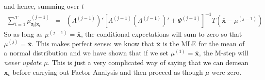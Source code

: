 \documentclass[12pt]{article}
\theoremstyle{definition}
\begin{document}
and hence, summing over $t$
	\begin{eqnarray*}
		\sum_{t = 1}^T \mu^{(j-1)}_{\mathbf{z}_t|\mathbf{x}_t} &=& \left(\Lambda^{(j-1)}\right)' \left[\Lambda^{(j-1)} \left(\Lambda^{(j-1)}\right)' + \Psi^{(j-1)}\right]^{-1} T\left(\bar{\mathbf{x}} - \mu^{(j-1)} \right)
 	\end{eqnarray*}
So as long as $\mu^{(j-1)} = \bar{\mathbf{x}}$, the conditional expectations will sum to zero so that $\mu^{(j)} = \bar{\mathbf{x}}$. This makes perfect sense: we know that $\bar{\mathbf{x}}$ is the MLE for the mean of a normal distribution and we have shown that if we set $\mu^{(1)} = \bar{\mathbf{x}}$, the M-step will \emph{never update} $\mu$. This is just a very complicated way of saying that we can demean $\mathbf{x}_t$ before carrying out Factor Analysis and then proceed as though $\mu$ were zero. 
\end{document}
